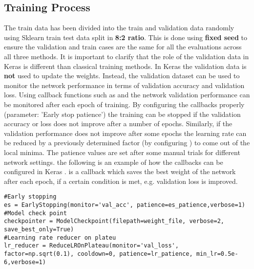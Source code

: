 \subsection{Training Process}
The train data has been divided into the train and validation data randomly using Sklearn train test data split \cite{sklearnsplit} in \textbf{8:2 ratio}. This is done using \textbf{fixed seed} to ensure the validation and train cases are the same for all the evaluations across all three methods. It is important to clarify that the role of the validation data in Keras is different than classical training methods. In Keras the validation data is \textbf{not} used to update the weights. Instead, the validation dataset can be used to monitor the network performance in terms of validation accuracy and validation loss. Using callback functions such as  and  \cite{kerascallbacks} the network validation performance can be monitored after each epoch of training.
By configuring the callbacks properly (parameter: 'Early stop patience') the training can be stopped if the validation accuracy or loss does not improve after a number of epochs.
Similarly, if the validation performance does not improve after some epochs the learning rate can be reduced by a previously determined factor (by configuring ) to come out of the local minima. The patience values are set after some manual trials for different network settings. the following is an example of how the callbacks can be configured in Keras \cite{kerascallbacks}.  is a callback which saves the best weight of the network 
after each epoch, if a certain condition is met, e.g. validation loss is improved.\\

\begin{lstlisting}
#Early stopping
es = EarlyStopping(monitor='val_acc', patience=es_patience,verbose=1)
#Model check point
checkpointer = ModelCheckpoint(filepath=weight_file, verbose=2, save_best_only=True) 
#Learning rate reducer on plateu
lr_reducer = ReduceLROnPlateau(monitor='val_loss', factor=np.sqrt(0.1), cooldown=0, patience=lr_patience, min_lr=0.5e-6,verbose=1)
\end{lstlisting}

